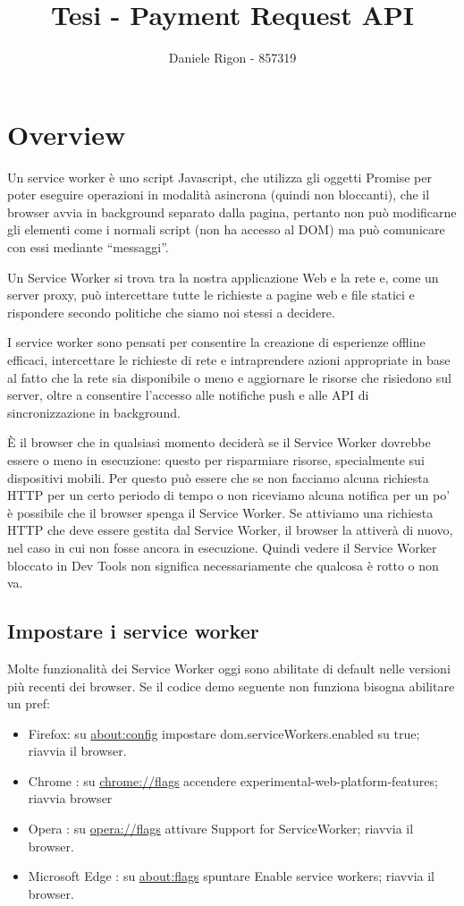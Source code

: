 \documentclass[italian]{article}
\author{
	Daniele Rigon - 857319 \\
}
\begin{document}
\title{Tesi - Payment Request API}
\maketitle

\tableofcontents
\pagebreak

\section{Overview}
Un service worker è uno script Javascript, che utilizza gli oggetti Promise per poter eseguire operazioni in modalità asincrona (quindi non bloccanti), che il browser avvia in background separato dalla pagina, pertanto non può modificarne gli elementi come i normali script (non ha accesso al DOM) ma può comunicare con essi mediante “messaggi”.

Un Service Worker si trova tra la nostra applicazione Web e la rete e, come un server proxy, può intercettare tutte le richieste a pagine web e file statici e rispondere secondo politiche che siamo noi stessi a decidere.

I service worker sono pensati per consentire la creazione di esperienze offline efficaci, intercettare le richieste di rete e intraprendere azioni appropriate in base al fatto che la rete sia disponibile o meno e aggiornare le risorse che risiedono sul server, oltre a consentire l'accesso alle notifiche push e alle API di sincronizzazione in background.

È il browser che in qualsiasi momento deciderà se il Service Worker dovrebbe essere o meno in esecuzione: questo per risparmiare risorse, specialmente sui dispositivi mobili. Per questo può essere che se non facciamo alcuna richiesta HTTP per un certo periodo di tempo o non riceviamo alcuna notifica per un po' è possibile che il browser spenga il Service Worker. Se attiviamo una richiesta HTTP che deve essere gestita dal Service Worker, il browser la attiverà di nuovo, nel caso in cui non fosse ancora in esecuzione. Quindi vedere il Service Worker bloccato in Dev Tools non significa necessariamente che qualcosa è rotto o non va.

\subsection{Impostare i service worker}
Molte funzionalità dei Service Worker oggi sono abilitate di default nelle versioni più recenti dei browser. Se il codice demo seguente non funziona bisogna abilitare un pref:
\begin{itemize}
	\item Firefox: su \url{about:config} impostare dom.serviceWorkers.enabled su true; riavvia il browser.
	\item Chrome : su \url{chrome://flags} accendere  experimental-web-platform-features; riavvia browser
	\item Opera : su \url{opera://flags} attivare Support for ServiceWorker; riavvia il browser.
	\item Microsoft Edge : su \url{about:flags} spuntare  Enable service workers; riavvia il browser.
\end{itemize}
\end{document}
